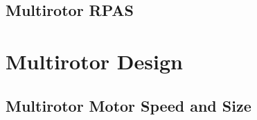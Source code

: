 \documentclass[10pt,letterpaper]{article}
\begin{document}
\subsection{Multirotor RPAS}\label{multirotor}


\clearpage
{}



\clearpage
\appendix
\section{Multirotor Design}\label{appendix:multirotor}
% 

\subsection{Multirotor Motor Speed and Size}\label{appendix:droneengine}

\end{document}
